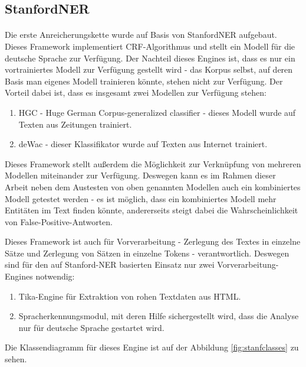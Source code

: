 \subsection{StanfordNER} 
\paragraph{}
Die erste Anreicherungskette wurde auf Basis von StanfordNER\cite{Jenny/etal:07} aufgebaut. Dieses Framework implementiert CRF-Algorithmus und stellt ein Modell für die deutsche Sprache zur Verfügung\cite{faruqui10:_training}. Der Nachteil dieses Engines ist, dass es nur ein vortrainiertes Modell zur Verfügung gestellt wird - das Korpus selbst, auf deren Basis man eigenes Modell trainieren könnte, stehen nicht zur Verfügung. Der Vorteil dabei ist, dass es insgesamt zwei Modellen zur Verfügung stehen:

\begin{enumerate}
\item HGC - Huge German Corpus-generalized classifier - dieses Modell wurde auf Texten aus Zeitungen trainiert.
\item deWac - dieser Klassifikator wurde auf Texten aus Internet trainiert.
\end{enumerate}

Dieses Framework stellt außerdem die Möglichkeit zur Verknüpfung von mehreren Modellen miteinander zur Verfügung. Deswegen kann es im Rahmen dieser Arbeit neben dem Austesten von oben genannten Modellen auch ein kombiniertes Modell getestet werden - es ist möglich, dass ein kombiniertes Modell mehr Entitäten im Text finden könnte, andererseits steigt dabei die Wahrscheinlichkeit von False-Positive-Antworten.

Dieses Framework ist auch für Vorverarbeitung - Zerlegung des Textes in einzelne Sätze und Zerlegung von Sätzen in einzelne Tokens - verantwortlich. Deswegen sind für den auf Stanford-NER basierten Einsatz nur zwei Vorverarbeitung-Engines notwendig:
\begin{enumerate}
\item Tika-Engine für Extraktion von rohen Textdaten aus HTML.
\item Spracherkennungsmodul, mit deren Hilfe sichergestellt wird, dass die Analyse nur für deutsche Sprache gestartet wird.
\end{enumerate}

Die Klassendiagramm für dieses Engine ist auf der Abbildung \ref{fig:stanfclasses} zu sehen.

